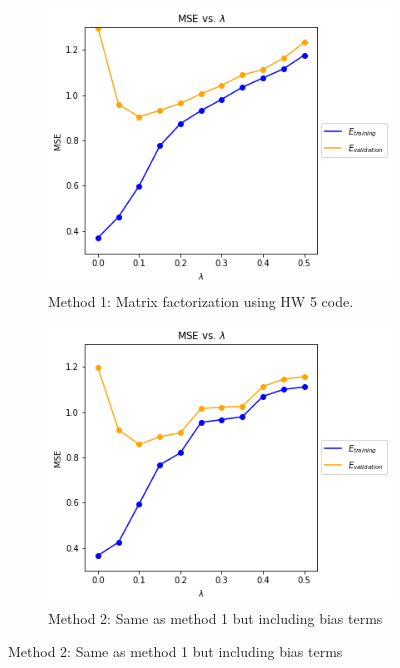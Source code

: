 \begin{figure}[H]
	\centering
	\begin{subfigure}[t]{0.3\textwidth}
		\centering
		\includegraphics[width=\textwidth]{MatrixFactor_hw}
		\caption{Method 1: Matrix factorization using HW 5 code.}
	\end{subfigure}%
	\begin{subfigure}[t]{0.3\textwidth}
		\centering
		\includegraphics[width=\textwidth]{MatrixFactorBias_hw}
		\caption{Method 2: Same as method 1 but including bias terms}
	\end{subfigure}

\end{figure}
